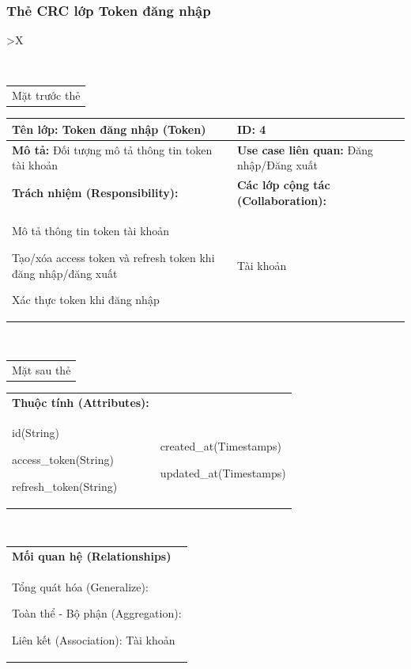 \subsubsection{Thẻ CRC lớp Token đăng nhập}
  \begin{xltabular}{\textwidth}{
    >{\centering\arraybackslash}X 
  }
  \caption{\bfseries \fontsize{12pt}{0pt}\selectfont Thẻ CRC lớp Token đăng nhập}
  \\
  \begin{tabularx}{0.9\textwidth}{X}
    Mặt trước thẻ
  \end{tabularx}
  \begin{tabularx}{0.9\textwidth}{|X|X|}
    \hline
    \textbf{Tên lớp:} Token đăng nhập (Token) & \textbf{ID:} 4  \\
    \hline
    \textbf{Mô tả:} Đối tượng mô tả thông tin token tài khoản & \textbf{Use case liên quan:} Đăng nhập/Đăng xuất \\
    \hline
    \textbf{Trách nhiệm (Responsibility):} & \textbf{Các lớp cộng tác (Collaboration):} \\
    Mô tả thông tin token tài khoản

    Tạo/xóa access token và refresh token khi đăng nhập/đăng xuất

    Xác thực token khi đăng nhập
    & 
    Tài khoản
    \\
    \hline
  \end{tabularx}
  \\
  \begin{tabularx}{0.9\textwidth}{X}
    Mặt sau thẻ
  \end{tabularx} 
  \begin{tabularx}{0.9\textwidth}{|X|X|}
    \hline
    \textbf{Thuộc tính (Attributes):} & \\
    id(String) 
    
    access\_token(String)
    
    refresh\_token(String) 
    & 
    
    created\_at(Timestamps)

    updated\_at(Timestamps)
    \\
    \hline
  \end{tabularx}
  \\     
  \begin{tabularx}{0.9\textwidth}{|X|}
    \textbf{Mối quan hệ (Relationships)} \\
    Tổng quát hóa (Generalize):

    Toàn thể - Bộ phận (Aggregation):
      
    Liên kết (Association): Tài khoản
    \\
    \hline
  \end{tabularx}
  \end{xltabular}

